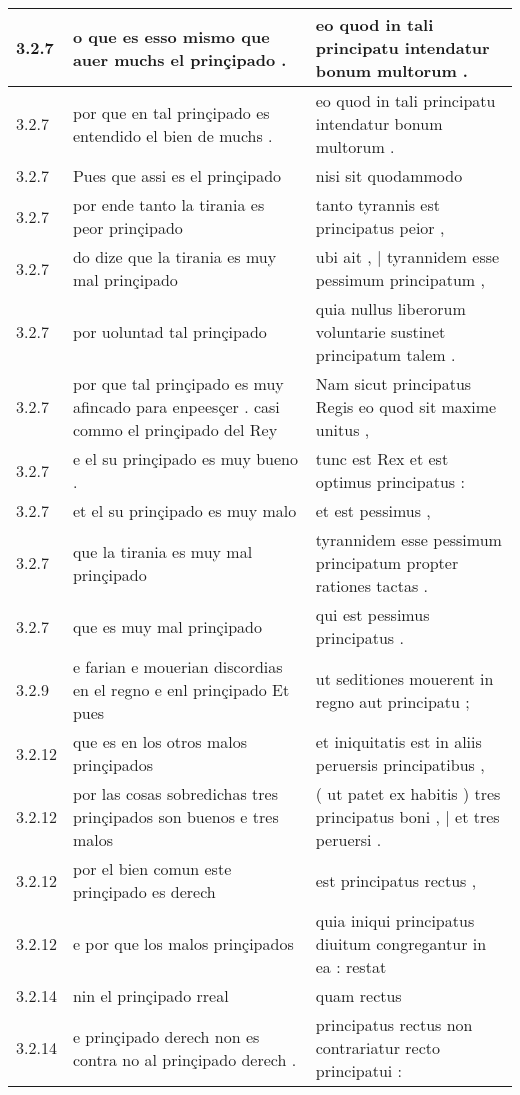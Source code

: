 \begin{tabular}{|p{1cm}|p{6.5cm}|p{6.5cm}|}
3.2.7 & o que es esso mismo que auer muchs el prinçipado . & eo quod in tali principatu intendatur bonum multorum . \\\hline
3.2.7 & por que en tal prinçipado es entendido el bien de muchs . & eo quod in tali principatu intendatur bonum multorum . \\\hline
3.2.7 & Pues que assi es el prinçipado & nisi sit quodammodo \\\hline
3.2.7 & por ende tanto la tirania es peor prinçipado & tanto tyrannis est principatus peior , \\\hline
3.2.7 & do dize que la tirania es muy mal prinçipado & ubi ait , | tyrannidem esse pessimum principatum , \\\hline
3.2.7 & por uoluntad tal prinçipado & quia nullus liberorum voluntarie sustinet principatum talem . \\\hline
3.2.7 & por que tal prinçipado es muy afincado para enpeesçer . casi commo el prinçipado del Rey & Nam sicut principatus Regis eo quod sit maxime unitus , \\\hline
3.2.7 & e el su prinçipado es muy bueno . & tunc est Rex et est optimus principatus : \\\hline
3.2.7 & et el su prinçipado es muy malo & et est pessimus , \\\hline
3.2.7 & que la tirania es muy mal prinçipado & tyrannidem esse pessimum principatum propter rationes tactas . \\\hline
3.2.7 & que es muy mal prinçipado & qui est pessimus principatus . \\\hline
3.2.9 & e farian e mouerian discordias en el regno e enl prinçipado Et pues & ut seditiones mouerent in regno aut principatu ; \\\hline
3.2.12 & que es en los otros malos prinçipados & et iniquitatis est in aliis peruersis principatibus , \\\hline
3.2.12 & por las cosas sobredichas tres prinçipados son buenos e tres malos & ( ut patet ex habitis ) tres principatus boni , | et tres peruersi . \\\hline
3.2.12 & por el bien comun este prinçipado es derech & est principatus rectus , \\\hline
3.2.12 & e por que los malos prinçipados & quia iniqui principatus diuitum congregantur in ea : restat \\\hline
3.2.14 & nin el prinçipado rreal & quam rectus \\\hline
3.2.14 & e prinçipado derech non es contra no al prinçipado derech . & principatus rectus non contrariatur recto principatui : \\\hline

\end{tabular}
